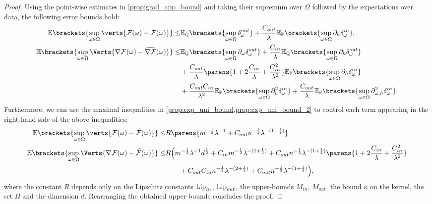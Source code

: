 \begin{proof}
Using the point-wise estimates in \cref{prop:grad_app_bound} and taking their supremum over $\Omega$ followed by the expectations over data, the following error bounds hold:
\begin{align*}
   \mathbb{E}\brackets{\sup_{\omega\in\Omega} \verts{\mathcal{F}(\omega)-\hat{\mathcal{F}}(\omega)}}
   \leq & 
    \mathbb{E}_{\mathbb{Q}}\brackets{\sup_{\omega\in\Omega}\Dout}
    +\frac{C_{out}}{\lambda}\mathbb{E}_{\mathbb{P}}\brackets{\sup_{\omega\in\Omega}\Dinh},\\
    \mathbb{E}\brackets{\sup_{\omega\in\Omega}\Verts{\nabla\mathcal{F}(\omega)-\widehat{\nabla\mathcal{F}}(\omega)}}
 	\leq &  
    \mathbb{E}_{\mathbb{Q}}\brackets{\sup_{\omega\in\Omega}\Doutw}  + \frac{C_{in}}{\lambda}\mathbb{E}_{\mathbb{Q}}\brackets{\sup_{\omega\in\Omega}\Douth}\\ 
    &+\frac{C_{out}}{\lambda}\parens{1 + 2\frac{C_{in}}{\lambda}+\frac{C_{in}^2}{\lambda^2}} \mathbb{E}_{\mathbb{P}}\brackets{\sup_{\omega\in\Omega}\Dinh}\\
    &+ \frac{C_{out}C_{in}}{\lambda^2}\mathbb{E}_{\mathbb{P}}\brackets{\sup_{\omega\in\Omega}\Dinhh} + \frac{C_{out}}{\lambda}\mathbb{E}_{\mathbb{P}}\brackets{\sup_{\omega\in\Omega}\Dinwh}.
\end{align*}
Furthermore, we can use the maximal inequalities in  \cref{prop:exp_uni_bound,prop:exp_uni_bound_2} to control each term appearing in the right-hand side of the above inequalities:
\begin{align*}
    \mathbb{E}\brackets{\sup_{\omega\in\Omega} \verts{\mathcal{F}(\omega)-\hat{\mathcal{F}}(\omega)}}
   \leq & 
   R\parens{ m^{-\frac{1}{2}}\lambda^{-1}  + C_{out}n^{-\frac{1}{2}}\lambda^{-(1+\frac{1}{4})}}\\
    \mathbb{E}\brackets{\sup_{\omega\in\Omega}\Verts{\nabla\mathcal{F}(\omega)-\widehat{\mathcal{F}}(\omega)}}
 	\leq &  R\Big( m^{-\frac{1}{2}}\lambda^{-1}d^{\frac{1}{2}} + C_{in}m^{-\frac{1}{2}}\lambda^{-(1+\frac{1}{4})} + C_{out}n^{-\frac{1}{2}}\lambda^{-(1+\frac{1}{4})}\parens{1 + 2\frac{C_{in}}{\lambda}+\frac{C_{in}^2}{\lambda^2}}\\
 	&\qquad+ C_{out}C_{in}n^{-\frac{1}{2}}\lambda^{-(2+\frac{1}{4})}  +  C_{out}n^{-\frac{1}{2}}\lambda^{-(1+\frac{1}{4})}\Big),
\end{align*}
where the constant $R$ depends only on the Lipschitz constants $\operatorname{Lip}_{in}$, $\operatorname{Lip}_{out}$, the upper-bounds $M_{in}$, $M_{out}$, the bound $\kappa$ on the kernel, the set $\Omega$ and the dimension $d$. Rearranging the obtained upper-bounds concludes the proof.
\end{proof}